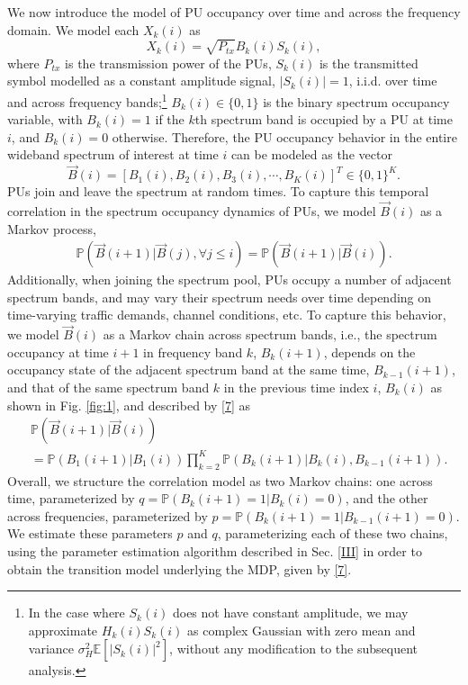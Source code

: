 \documentclass[10pt,twocolumn]{IEEEtran}
\begin{document}
We now introduce the model of PU occupancy over time and across the frequency domain. We model each $X_k(i)$ as 
\begin{equation}\label{4}
    X_k(i) = \sqrt{P_{tx}}B_k(i)S_k(i),
\end{equation}
where $P_{tx}$ is the transmission power of the PUs, $S_k(i)$ is the transmitted symbol modelled as a constant amplitude signal, $|S_k(i)|{=}1$, i.i.d. over time and across frequency bands;\footnote{In the case where $S_k(i)$ does not have constant amplitude, we may approximate $H_{k}(i)S_{k}(i)$ as complex Gaussian with zero mean and variance $\sigma_H^2\mathbb E[|S_{k}(i)|^2]$, without any modification to the subsequent analysis.} $B_k(i){\in}\{0,1\}$ is the binary spectrum occupancy variable, with $B_k(i){=}1$ if the $k$th spectrum band is occupied by a PU at time $i$, and $B_k(i){=}0$ otherwise. Therefore, the PU occupancy behavior in the entire wideband spectrum of interest at time $i$ can be modeled as the vector 
\begin{equation}\label{5}
    \vec{B}(i) = [B_1(i), B_2(i), B_3(i), \cdots, B_K(i)]^T {\in} \{0, 1\}^K.
\end{equation}
PUs join and leave the spectrum at random times. To capture this temporal correlation in the spectrum occupancy dynamics of PUs, we model $\vec{B}(i)$ as a Markov process,
\begin{equation}\label{6}
    \begin{aligned}
        \mathbb{P}(\vec{B}(i+1)|\vec{B}(j), \forall j \leq i) = \mathbb{P}(\vec{B}(i+1)|\vec{B}(i)).
    \end{aligned}
\end{equation}
Additionally, when joining the spectrum pool, PUs occupy a number of adjacent spectrum bands, and may vary their spectrum needs over time depending on time-varying traffic demands, channel conditions, etc. To capture this behavior, we model $\vec{B}(i)$ as a Markov chain across spectrum bands, i.e., the spectrum occupancy at time $i+1$ in frequency band $k$, $B_{k}(i+1)$, depends on the  occupancy state of the adjacent spectrum band at the same time, $B_{k-1}(i+1)$, and that of the same spectrum band $k$ in the previous time index $i$, $B_{k}(i)$ as shown in Fig. \ref{fig:1}, and described by \eqref{7} as
\begin{align}\label{7}
&         \mathbb{P}(\vec{B}(i+1)|\vec{B}(i))\\&=
\nonumber
         \mathbb{P}(B_{1}(i+1)|B_{1}(i))
         \prod_{k=2}^{K} \mathbb{P}(B_{k}(i+1)|B_{k}(i), B_{k-1}(i+1)).
\end{align}
Overall, we structure the correlation model as two Markov chains: one across time, parameterized by $q{=}\mathbb{P}(B_{k}(i{+}1){=}1|B_{k}(i){=}0)$, and the other across frequencies, parameterized by $p{=}\mathbb{P}(B_{k}(i{+}1){=}1|B_{k{-}1}(i{+}1){=}0)$. We estimate these parameters $p$ and $q$, parameterizing each of these two chains, using the parameter estimation algorithm described in Sec. \ref{III} in order to obtain the transition model underlying the MDP, given by \eqref{7}.
\end{document}
